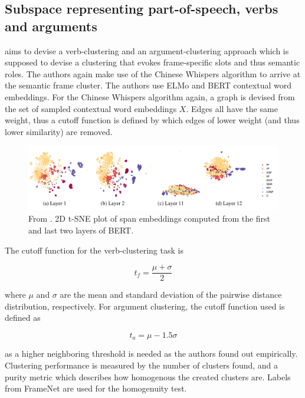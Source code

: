 \documentclass[a4paper,12pt,oneside,openright]{report}
\begin{document}
\subsection{Subspace representing part-of-speech, verbs and arguments}

\cite{ribeiro19} aims to devise a verb-clustering and an argument-clustering approach which is supposed to devise a clustering that evokes frame-specific slots and thus semantic roles.
The authors again make use of the Chinese Whispers algorithm
\cite{biemann06} to arrive at the semantic frame cluster.
The authors use ELMo and BERT contextual word embeddings.
For the Chinese Whispers algorithm again, a graph is devised from the set of sampled contextual word embeddings $X$.
Edges all have the same weight, thus a cutoff function is defined by  which edges of lower weight (and thus lower similarity) are removed.

\begin{figure}[H]
	\center
  \includegraphics[width=0.9\linewidth]{./assets/relatedwork/BERT_tsne_layers.png}
  \caption{From \cite{jawahar19}. 2D t-SNE plot of span embeddings computed from the first and last two layers of BERT.}
  \label{fig:cold_fictional_desired}
\end{figure}

The cutoff function for the verb-clustering task is

\begin{equation}
t_f = \frac{\mu + \sigma}{2}
\end{equation}

where $\mu$ and $\sigma$ are the mean and standard deviation of the pairwise distance distribution, respectively. 
For argument clustering, the cutoff function used is defined as

\begin{equation}
t_a = \mu - 1.5 \sigma
\end{equation}

as a higher neighboring threshold is needed as the authors found out empirically.
Clustering performance is measured by the number of clusters found, and a purity metric which describes how homogenous the created clusters are. 
Labels from FrameNet \cite{baker98} are used for the homogenuity test. \\
\end{document}
